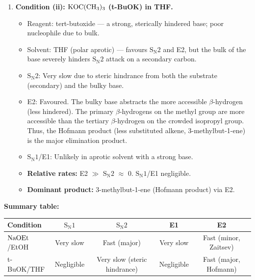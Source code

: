 \documentclass[11pt]{article}
\begin{document}
\begin{corrige}
\begin{enumerate}
\item \textbf{Condition (ii): \(\ce{KOC(CH3)3}\) (t-BuOK) in THF.}
\begin{itemize}
\item Reagent: tert-butoxide — a strong, sterically hindered base; poor nucleophile due to bulk.
\item Solvent: THF (polar aprotic) — favours \(\mathrm{S_N2}\) and E2, but the bulk of the base severely hinders \(\mathrm{S_N2}\) attack on a secondary carbon.
\item \(\mathrm{S_N2}\): Very slow due to steric hindrance from both the substrate (secondary) and the bulky base.
\item E2: Favoured. The bulky base abstracts the more accessible \(\beta\)-hydrogen (less hindered). The primary \(\beta\)-hydrogens on the methyl group are more accessible than the tertiary \(\beta\)-hydrogen on the crowded isopropyl group. Thus, the Hofmann product (less substituted alkene, 3-methylbut-1-ene) is the major elimination product.
\item \(\mathrm{S_N1}\)/E1: Unlikely in aprotic solvent with a strong base.
\item \textbf{Relative rates:} E2 \(\gg\) \(\mathrm{S_N2}\) \(\approx\) 0. \(\mathrm{S_N1}\)/E1 negligible.
\item \textbf{Dominant product:} 3-methylbut-1-ene (Hofmann product) via E2.
\end{itemize}
\end{enumerate}

\textbf{Summary table:}

\begin{center}
\begin{tabular}{|l|c|c|c|c|}
\hline
Condition & \(\mathrm{S_N1}\) & \(\mathrm{S_N2}\) & E1 & E2 \\ \hline
\(\ce{NaOEt}\)/EtOH & Very slow & Fast (major) & Very slow & Fast (minor, Zaitsev) \\ \hline
t-BuOK/THF & Negligible & Very slow (steric hindrance) & Negligible & Fast (major, Hofmann) \\ \hline
\end{tabular}
\end{center}
\end{corrige}
\end{document}
